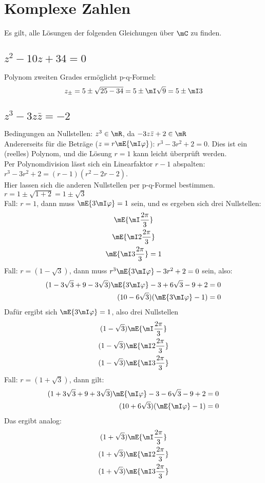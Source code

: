 \section{Komplexe Zahlen}
	Es gilt, alle Lösungen der folgenden Gleichungen über $\mC$ zu finden.
	\subsection{$z^2-10 z + 34= 0$}
	Polynom zweiten Grades ermöglicht p-q-Formel:
	\begin{equation}
		z_\pm = 5 \pm \sqrt{25-34} = 5 \pm \mI \sqrt{9} = 5 \pm \mI 3
	\end{equation}

	\subsection{$z^3-3 z\bar{z} = - 2$}
	Bedingungen an Nullstellen: $z^3 \in \mR$, da $-3z\bar{z}+2\in \mR$\\
	Andererseits für die Beträge ($z=r\mE{\mI\varphi}$): $r^3-3r^2+2=0$. Dies ist ein (reelles) Polynom, und die Lösung $r=1$ kann leicht überprüft werden.\\
	Per Polynomdivision lässt sich ein Linearfaktor $r-1$ abspalten: $r^3-3r^2+2 = (r-1)(r^2-2r-2)$.\\
	Hier lassen sich die anderen Nullstellen per p-q-Formel bestimmen. $r = 1 \pm \sqrt{1+2} = 1\pm\sqrt{3}$\\
	Fall: $r = 1$, dann muss $\mE{3\mI\varphi} = 1$ sein, und es ergeben sich drei Nullstellen: 
	\begin{gather}
		\mE{\mI\frac{2\pi}{3}} \\
		\mE{\mI 2\frac{2\pi}{3}}\\
		\mE{\mI 3\frac{2\pi}{3}}=1
	\end{gather}
	Fall: $r = (1 - \sqrt{3})$, dann muss $r^3\mE{3\mI\varphi} - 3 r^2 + 2 = 0$ sein, also:
	\begin{align}
		(1 - 3\sqrt{3} + 9 - 3\sqrt{3})\mE{3\mI\varphi} - 3 + 6 \sqrt{3} - 9 +2 & = 0 \\
		(10-6\sqrt{3})(\mE{3\mI\varphi}-1) & = 0
	\end{align}
	Dafür ergibt sich $\mE{3\mI\varphi} = 1$, also drei Nullstellen
	\begin{gather}
		(1 - \sqrt{3})\mE{\mI\frac{2\pi}{3}} \\
		(1 - \sqrt{3})\mE{\mI 2\frac{2\pi}{3}}\\
		(1 - \sqrt{3})\mE{\mI 3\frac{2\pi}{3}}
	\end{gather}
	Fall: $r = (1 + \sqrt{3})$, dann gilt:
	\begin{align}
		(1 + 3\sqrt{3} + 9 + 3\sqrt{3})\mE{\mI\varphi} - 3 - 6 \sqrt{3} - 9 +2 & = 0 \\
		(10+6\sqrt{3})(\mE{\mI\varphi}-1) & = 0
	\end{align}
	Das ergibt analog:
	\begin{gather}
		(1 + \sqrt{3})\mE{\mI\frac{2\pi}{3}} \\
		(1 + \sqrt{3})\mE{\mI 2\frac{2\pi}{3}}\\
		(1 + \sqrt{3})\mE{\mI 3\frac{2\pi}{3}}
	\end{gather}

